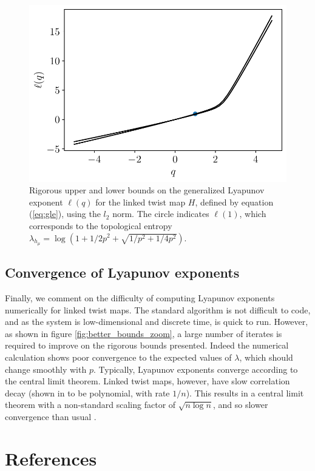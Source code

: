 \documentclass{iopart}
\begin{document}
\begin{figure}
\centering
\includegraphics[width=0.75\linewidth]{ltm_gle.pdf}
\caption{Rigorous upper and lower bounds on the generalized Lyapunov exponent $\ell(q)$ for the linked twist map $H$, defined by equation (\ref{eq:gle}), using the $l_2$ norm. The circle indicates $\ell(1)$, which corresponds to the topological entropy $\lambda_{h_\mu} =  \log(1+1/2p^2 + \sqrt{1/p^2+1/4p^2})$.}\label{fig:ltm_gle}
\end{figure}

\subsection{Convergence of Lyapunov exponents}

Finally, we comment on the difficulty of computing Lyapunov exponents numerically for linked twist maps. The standard algorithm \cite{parker2012practical} is not difficult to code, and as the system is low-dimensional and discrete time, is quick to run. However, as shown in figure \ref{fig:better_bounds_zoom}, a large number of iterates is required to improve on the rigorous bounds  presented. Indeed the numerical calculation shows poor convergence to the expected values of $\lambda$, which should change smoothly with $p$. Typically, Lyapunov exponents converge according to the 
central limit theorem. Linked twist maps, however, have slow correlation decay (shown in \cite{springham2014polynomial} to be polynomial, with rate $1/n$). This results in a central limit theorem with a non-standard scaling factor of $\sqrt{n \log n}$, and so slower convergence than usual \cite{mohr2013martingale}.	

\section*{References}

\end{document}
